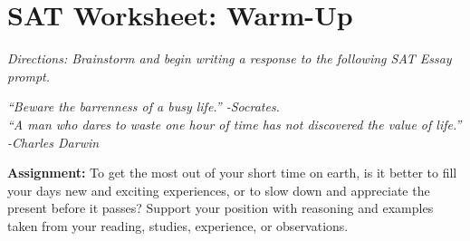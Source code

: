 \section{SAT Worksheet: Warm-Up}

\textit{Directions: Brainstorm and begin writing a response to the following SAT Essay prompt.}

\textit{``Beware the barrenness of a busy life.'' -Socrates. \\ ``A man who dares to waste one hour of time has not discovered the value of life.'' -Charles Darwin}

\medskip
\large{\bf{Assignment:}} To get the most out of your short time on earth, is it better to fill your days new and exciting experiences, or to slow down and appreciate the present before it passes? Support your position with reasoning and examples taken from your reading, studies, experience, or observations.